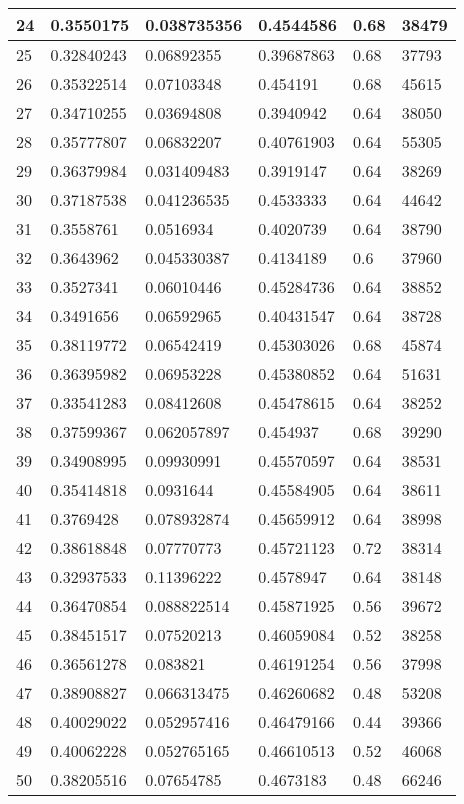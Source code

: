 \begin{longtable}{|l|l|l|l|l|l|}
24 & 0.3550175 & 0.038735356 & 0.4544586 & 0.68 & 38479 \\ \hline 
25 & 0.32840243 & 0.06892355 & 0.39687863 & 0.68 & 37793 \\ \hline 
26 & 0.35322514 & 0.07103348 & 0.454191 & 0.68 & 45615 \\ \hline 
27 & 0.34710255 & 0.03694808 & 0.3940942 & 0.64 & 38050 \\ \hline 
28 & 0.35777807 & 0.06832207 & 0.40761903 & 0.64 & 55305 \\ \hline 
29 & 0.36379984 & 0.031409483 & 0.3919147 & 0.64 & 38269 \\ \hline 
30 & 0.37187538 & 0.041236535 & 0.4533333 & 0.64 & 44642 \\ \hline 
31 & 0.3558761 & 0.0516934 & 0.4020739 & 0.64 & 38790 \\ \hline 
32 & 0.3643962 & 0.045330387 & 0.4134189 & 0.6 & 37960 \\ \hline 
33 & 0.3527341 & 0.06010446 & 0.45284736 & 0.64 & 38852 \\ \hline 
34 & 0.3491656 & 0.06592965 & 0.40431547 & 0.64 & 38728 \\ \hline 
35 & 0.38119772 & 0.06542419 & 0.45303026 & 0.68 & 45874 \\ \hline 
36 & 0.36395982 & 0.06953228 & 0.45380852 & 0.64 & 51631 \\ \hline 
37 & 0.33541283 & 0.08412608 & 0.45478615 & 0.64 & 38252 \\ \hline 
38 & 0.37599367 & 0.062057897 & 0.454937 & 0.68 & 39290 \\ \hline 
39 & 0.34908995 & 0.09930991 & 0.45570597 & 0.64 & 38531 \\ \hline 
40 & 0.35414818 & 0.0931644 & 0.45584905 & 0.64 & 38611 \\ \hline 
41 & 0.3769428 & 0.078932874 & 0.45659912 & 0.64 & 38998 \\ \hline 
42 & 0.38618848 & 0.07770773 & 0.45721123 & 0.72 & 38314 \\ \hline 
43 & 0.32937533 & 0.11396222 & 0.4578947 & 0.64 & 38148 \\ \hline 
44 & 0.36470854 & 0.088822514 & 0.45871925 & 0.56 & 39672 \\ \hline 
45 & 0.38451517 & 0.07520213 & 0.46059084 & 0.52 & 38258 \\ \hline 
46 & 0.36561278 & 0.083821 & 0.46191254 & 0.56 & 37998 \\ \hline 
47 & 0.38908827 & 0.066313475 & 0.46260682 & 0.48 & 53208 \\ \hline 
48 & 0.40029022 & 0.052957416 & 0.46479166 & 0.44 & 39366 \\ \hline 
49 & 0.40062228 & 0.052765165 & 0.46610513 & 0.52 & 46068 \\ \hline 
50 & 0.38205516 & 0.07654785 & 0.4673183 & 0.48 & 66246 \\ \hline 
\end{longtable}